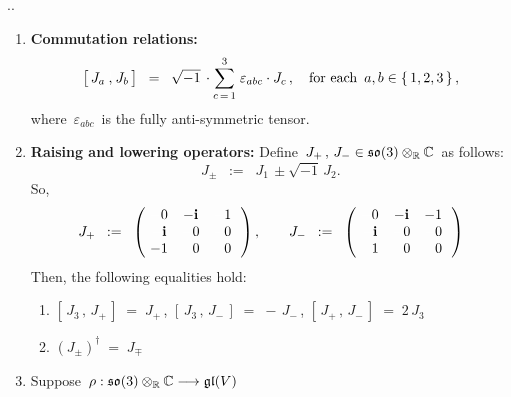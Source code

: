 \begin{proposition}
{\color{white}.}\vskip -0.5cm{\color{white}.}
\begin{enumerate}
\item
	\textbf{Commutation relations:}\;\;
	\begin{equation*}
	\left[\,J_{a}\,\overset{{\color{white}1}}{,}\,J_{b}\,\right]
	\;\; = \;\;
		\sqrt{-1}\,\cdot\overset{3}{\underset{c\,=\,1}{\sum}}\;\varepsilon_{abc}\cdot J_{c}\,,
	\quad
	\textnormal{for each \,$a, b \in \{\,1,2,3\,\}$}\,,
	\end{equation*}
	where \,$\varepsilon_{abc}$\, is the fully anti-symmetric tensor.
\item
	\textbf{Raising and lowering operators:}\;\;
	Define \,$J_{+}\,,\, J_{-} \in \mathfrak{so}(3) \otimes_{\mathbb{R}} \mathbb{C}$\, as follows:
	\begin{equation*}
	J_{\pm} \;\; := \;\; J_{1} \, \pm \sqrt{-1}\,J_{2}.
	\end{equation*}
	So,
	\begin{equation*}
	J_{+}
	\;\; := \;\;
	\left(\!
		\begin{array}{ccc}
			{\color{white}-}0 & {\color{black}-}\i & {\color{white}-}1 \\
			{\color{white}-}\i & {\color{white}-}0 & {\color{white}-}0 \\
			{\color{black}-}1 & {\color{white}-}0 & {\color{white}-}0 \\
			\end{array}
		\,\right),
	\quad\quad
	J_{-}
	\;\; := \;\;
	\left(\!
		\begin{array}{ccc}
			{\color{white}-}0 & {\color{black}-}\i & {\color{black}-}1 \\
			{\color{white}-}\i & {\color{white}-}0 & {\color{white}-}0 \\
			{\color{white}-}1 & {\color{white}-}0 & {\color{white}-}0 \\
			\end{array}
		\,\right)
	\end{equation*}
	Then, the following equalities hold:
	\begin{enumerate}
	\item
		$\left[\,J_{3}\,,\,J_{+}\,\right] \;=\; J_{+}$\,,
		\quad
		$\left[\,J_{3}\,,\,J_{-}\,\right] \;=\; -\,J_{-}$\,,
		\quad
		$\left[\,J_{+}\,,\,J_{-}\,\right] \;=\; 2\,J_{3}$
	\item
		$(J_{\pm})^{\dagger} \; = \; J_{\mp}$
	\end{enumerate}
\item
	Suppose
	\,$\rho : \mathfrak{so}(3) \otimes_{\mathbb{R}} \mathbb{C} \longrightarrow \mathfrak{gl}(V)$\,

\end{enumerate}
\end{proposition}
